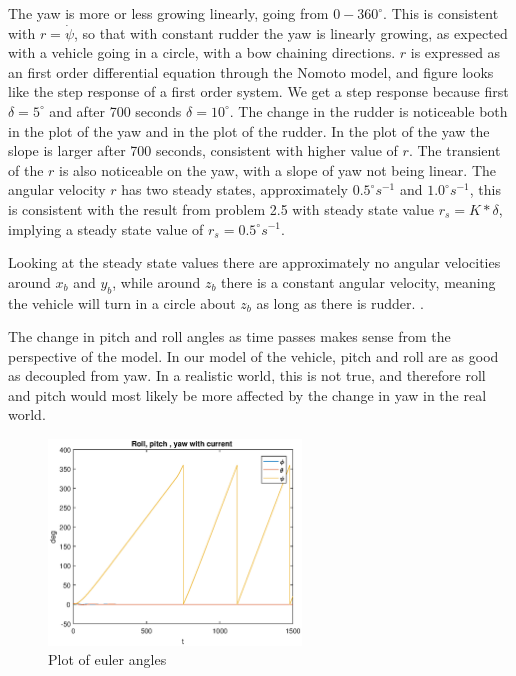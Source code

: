 The yaw is more or less growing linearly, going from $0-360 ^\circ$. This is consistent with $r = \dot{\psi}$, so that with constant rudder the yaw is linearly growing, as expected with a vehicle going in a circle, with a bow chaining directions. $r$ is expressed as an first order differential equation through the Nomoto model, and  figure  looks like the step response of a first order system. We get a step response because first $\delta = 5^\circ$ and after 700 seconds $\delta = 10^\circ$.  The change in the rudder is noticeable both in the plot of the yaw and in the plot of the rudder. In the plot of the yaw the slope is larger after 700 seconds, consistent with higher value of $r$. The transient of the $r$ is also noticeable on the yaw, with a slope of yaw not being linear. The angular velocity $r$ has two steady states, approximately  $0.5^\circ s^{-1}$  and $1.0^\circ s^{-1}$, this is consistent with the result from problem 2.5 with steady state value $r_s = K*\delta$, implying a steady state value of $r_s = 0.5^\circ s^{-1}$. 

Looking at the steady state values there are approximately no angular velocities around $x_b$ and $y_b$, while around $z_b$ there is a constant angular velocity, meaning the vehicle will turn in a circle about $z_b$ as long as there is rudder. .

The change in pitch and roll angles as time passes makes sense from the perspective of the model. In our model of the vehicle, pitch and roll are as good as decoupled from yaw. In a realistic world, this is not true, and therefore roll and pitch would most likely be more affected by the change in yaw in the real world.


\begin{figure}[!ht]
	\centering
	\includegraphics[width=0.6\textwidth]{figures/2_6_ang.eps}
	\caption{Plot of euler angles}
	\label{fig:2_6_ang}
\end{figure}

